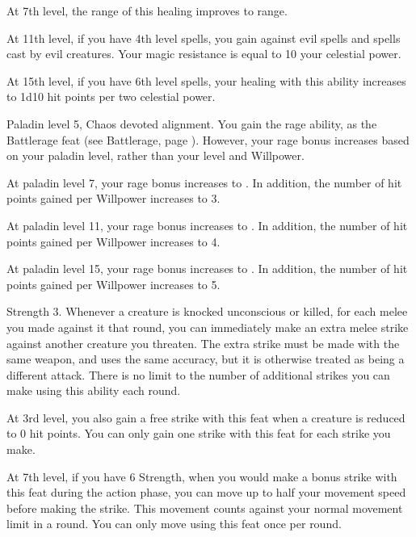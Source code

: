     At 7th level, the range of this healing improves to \rngmed range.

    At 11th level, if you have 4th level spells, you gain  against evil spells and spells cast by evil creatures.
    Your magic resistance is equal to 10 \add your celestial power.

    At 15th level, if you have 6th level spells, your healing with this ability increases to 1d10 hit points per two celestial power.

    \featpres Paladin level 5, Chaos devoted alignment.
    \featben You gain the rage ability, as the Battlerage feat (see Battlerage, page ).
    However, your rage bonus increases based on your paladin level, rather than your level and Willpower.

    At paladin level 7, your rage bonus increases to .
    In addition, the number of hit points gained per Willpower increases to 3.

    At paladin level 11, your rage bonus increases to .
    In addition, the number of hit points gained per Willpower increases to 4.

    At paladin level 15, your rage bonus increases to .
    In addition, the number of hit points gained per Willpower increases to 5.

    \featpre Strength 3.
    \featben Whenever a creature is knocked unconscious or killed, for each melee  you made against it that round, you can immediately make an extra melee strike against another creature you threaten.
    The extra strike must be made with the same weapon, and uses the same accuracy, but it is otherwise treated as being a different attack.
    There is no limit to the number of additional strikes you can make using this ability each round.

    At 3rd level, you also gain a free strike with this feat when a creature is reduced to 0 hit points.
    You can only gain one strike with this feat for each strike you make.

    At 7th level, if you have 6 Strength, when you would make a bonus strike with this feat during the action phase, you can move up to half your movement speed before making the strike.
    This movement counts against your normal movement limit in a round.
    You can only move using this feat once per round.

